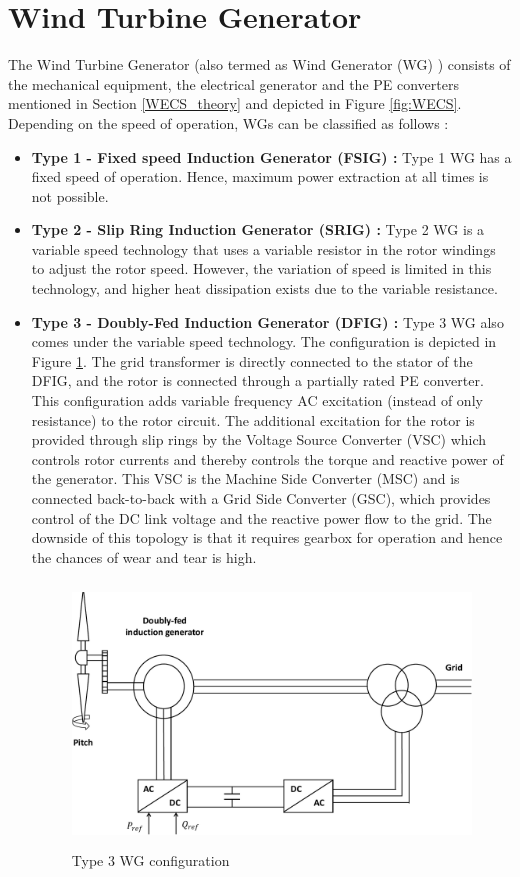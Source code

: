 \section{Wind Turbine Generator}
The Wind Turbine Generator (also termed as Wind Generator (\gls{WG}) ) consists of the mechanical equipment, the electrical generator and the \gls{PE} converters mentioned in Section \ref{WECS_theory} and depicted in Figure \ref{fig:WECS}. Depending on the speed of operation, \gls{WG}s can be classified as follows \cite{ali_wind_2012}:

\begin{itemize}
    \item \textbf{Type 1 - Fixed speed Induction Generator (FSIG) :} Type 1 \gls{WG} has a fixed speed of operation. Hence, maximum power extraction at all times is not possible.
    \item \textbf{Type 2 - Slip Ring Induction Generator (SRIG) :} Type 2 \gls{WG} is a variable speed technology that uses a variable resistor in the rotor windings to adjust the rotor speed. However, the variation of speed is limited in this technology, and higher heat dissipation exists due to the variable resistance.
    \item \textbf{Type 3 - Doubly-Fed Induction Generator (DFIG) :} Type 3 \gls{WG} also comes under the variable speed technology. The configuration is depicted in Figure \ref{fig:Type3}. The grid transformer is directly connected to the stator of the DFIG, and the rotor is connected through a partially rated \gls{PE} converter. This configuration adds variable frequency \gls{AC} excitation (instead of only resistance) to the rotor circuit. The additional excitation for the rotor is provided through slip rings by the Voltage Source Converter (\gls{VSC}) which controls rotor currents and thereby controls the torque and reactive power of the generator. This \gls{VSC} is the Machine Side Converter (\gls{MSC}) and is connected back-to-back with a Grid Side Converter (\gls{GSC}), which provides control of the \gls{DC} link voltage and the reactive power flow to the grid. The downside of this topology is that it requires gearbox for operation and hence the chances of wear and tear is high.
    
    \begin{figure}[H]
\centering
    \includegraphics[height = 7cm,width = 12cm]{Diagrams/Chapter_2/Type3WT_new.pdf}
    \caption{Type 3 WG configuration \cite{ali_wind_2012}}
    \label{fig:Type3}
\end{figure}
    

\end{itemize}
